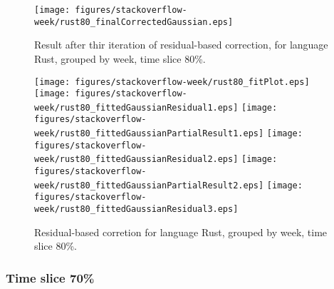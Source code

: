 \begin{figure}[]
\centering
{\texttt{[image: figures/stackoverflow-week/rust80\_finalCorrectedGaussian.eps]}}
\caption{Result after thir iteration of residual-based correction, for language Rust, grouped by week, time slice 80\%.}
\end{figure}


\begin{figure}[hb]
\centering
{}
{\texttt{[image: figures/stackoverflow-week/rust80\_fitPlot.eps]}}
{\texttt{[image: figures/stackoverflow-week/rust80\_fittedGaussianResidual1.eps]}}
{\texttt{[image: figures/stackoverflow-week/rust80\_fittedGaussianPartialResult1.eps]}}
{\texttt{[image: figures/stackoverflow-week/rust80\_fittedGaussianResidual2.eps]}}
{\texttt{[image: figures/stackoverflow-week/rust80\_fittedGaussianPartialResult2.eps]}}
{\texttt{[image: figures/stackoverflow-week/rust80\_fittedGaussianResidual3.eps]}}
\caption{Residual-based corretion for language Rust, grouped by week, time slice 80\%.}
\end{figure}


\clearpage 
\newpage 


\FloatBarrier

\subsubsection{Time slice 70\%}


